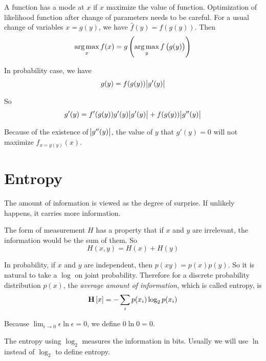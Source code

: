 \begin{theorem}
    A function has a mode at $x$ if $x$ maximize the value of function. Optimization of likelihood function after change of parameters needs to be careful. For a usual change of variables $x = g(y)$, we have $\hat{f}(y) = f(g(y))$. Then
    \begin{equation}
         \mathop{\arg\max}\limits_{x}f(x) = g\left(\mathop{\arg\max}\limits_{y}f\left(g(y)\right)\right)
    \end{equation}
    
    In probability case, we have
    \begin{equation}
        g(y) = f(g(y)) \abs{g'(y)}
    \end{equation}
    
    So
    \begin{equation}
        g'(y) = f'(g(y)) g'(y) \abs{g'(y)} + f(g(y)) \abs{g''(y)}
    \end{equation}
    
    Because of the existence of $\abs{g''(y)}$, the value of $y$ that $g'(y) = 0$ will not maximize $f_{x = g(y)}(x)$.
\end{theorem}


\section{Entropy}

\begin{definition}
    The amount of information is viewed as the degree of surprise. If unlikely happens, it carries more information. 
    
    The form of measurement $H$ has a property that if $x$ and $y$ are irrelevant, the information would be the sum of them. So
    \begin{equation}
        H(x,y) = H(x) + H(y)
    \end{equation}
    
    In probability, if $x$ and $y$ are independent, then $p(xy)= p(x) p(y)$. So it is natural to take a $\log$ on joint probability. Therefore for a discrete probability distribution $p(x)$, the \emph{average amount of information}, which is called entropy, is
    \begin{equation}
        \mathop{\bf H\/}\left[\displaystyle x \right] = - \sum_i p(x_i) \log_2 p(x_i)
    \end{equation}
    
    Because $\displaystyle \lim_{\epsilon \rightarrow 0} \epsilon \ln \epsilon = 0$, we define $0 \ln 0 = 0$.
    
    The entropy using $\log_2$ measures the information in bits. Usually we will use $\ln$ instead of $\log_2$ to define entropy.
\end{definition}

